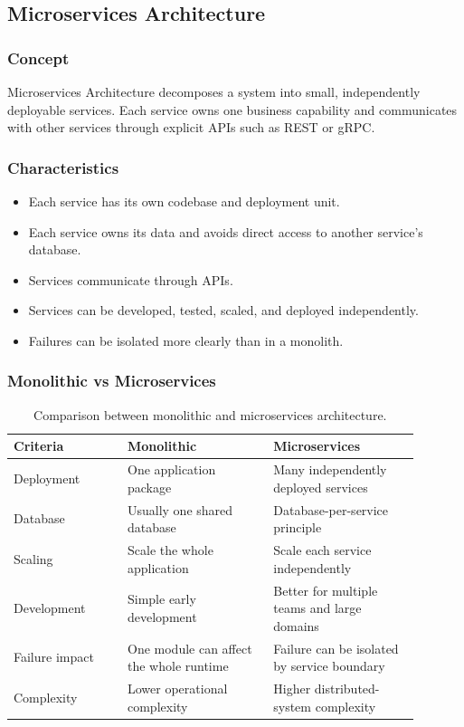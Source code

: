 \documentclass[12pt,a4paper]{article}
\begin{document}
\subsection{Microservices Architecture}

\subsubsection{Concept}

Microservices Architecture decomposes a system into small, independently deployable services. Each service owns one business capability and communicates with other services through explicit APIs such as REST or gRPC.

\subsubsection{Characteristics}

\begin{itemize}
    \item Each service has its own codebase and deployment unit.
    \item Each service owns its data and avoids direct access to another service's database.
    \item Services communicate through APIs.
    \item Services can be developed, tested, scaled, and deployed independently.
    \item Failures can be isolated more clearly than in a monolith.
\end{itemize}

\subsubsection{Monolithic vs Microservices}

\begin{table}[H]
\centering
\caption{Comparison between monolithic and microservices architecture.}
\label{tab:mono-vs-micro}
\begin{tabular}{p{0.25\linewidth}p{0.32\linewidth}p{0.32\linewidth}}
\toprule
\textbf{Criteria} & \textbf{Monolithic} & \textbf{Microservices}\\
\midrule
Deployment & One application package & Many independently deployed services\\
Database & Usually one shared database & Database-per-service principle\\
Scaling & Scale the whole application & Scale each service independently\\
Development & Simple early development & Better for multiple teams and large domains\\
Failure impact & One module can affect the whole runtime & Failure can be isolated by service boundary\\
Complexity & Lower operational complexity & Higher distributed-system complexity\\
\bottomrule
\end{tabular}
\end{table}
\end{document}
